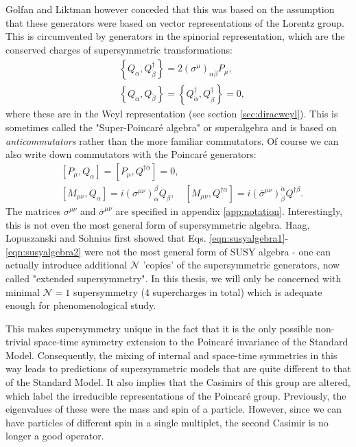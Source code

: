 Golfan and Liktman \cite{RN519} however conceded that this was based on the assumption that these generators were based on vector representations of the Lorentz group. This is circumvented by generators in the spinorial representation, which are the conserved charges of supersymmetric transformations:
\begin{align}
&\left\{ Q_{\alpha}, Q^{\dagger}_{\dot{\beta}} \right\}=2 \left( \sigma^{\mu}\right)_{\alpha \dot{\beta}}P_{\mu}, \label{eqn:susyalgebra1} \\
&\left\{ Q_{\alpha}, Q_{\dot{\beta}} \right\}=\left\{ Q^{\dagger}_{\dot{\alpha}}, Q^{\dagger}_{\dot{\beta}} \right\} = 0,
\label{eqn:susyalgebra2}
\end{align}
where these are in the Weyl representation (see section \ref{sec:diracweyl}). This is sometimes called the "Super-Poincar\'{e} algebra" or superalgebra and is based on \textit{anticommutators} rather than the more familiar commutators. Of course we can also write down commutators with the Poincar\'{e} generators:
\begin{align}
&\left[ P_{\mu},Q_{\alpha}\right]=\left[ P_{\mu},Q^{\dagger \dot{\alpha}}\right]=0, \label{eqn:comm1} \\
&\left[ M_{\mu\nu},Q_{\alpha}\right]=i \left(\sigma^{\mu\nu}\right)_{\alpha}^{\beta}Q_{\beta},\quad
\left[ M_{\mu\nu},Q^{\dagger \dot{\alpha}}\right]=i \left(\overline{\sigma}^{\mu\nu}\right)^{\dot{\alpha}}_{\dot{\beta}}Q^{\dagger \dot{\beta}}.
\end{align}
The matrices ${\sigma}^{\mu\nu}$ and $\overline{\sigma}^{\mu\nu}$ are specified in appendix \ref{app:notation}. Interestingly, this is not even the most general form of supersymmetric algebra. Haag, Lopuszanski and Sohnius \cite{RN522} first showed that Eqs. \ref{eqn:susyalgebra1}-\ref{eqn:susyalgebra2} were not the most general form of SUSY algebra - one can actually introduce additional $\mathcal{N}$ 'copies' of the supersymmetric generators, now called "extended supersymmetry". In this thesis, we will only be concerned with minimal $\mathcal{N}=1$ supersymmetry (4 supercharges in total) which is adequate enough for phenomenological study.

This makes supersymmetry unique in the fact that it is the only possible non-trivial space-time symmetry extension to the Poincar\'{e} invariance of the Standard Model. Consequently, the mixing of internal and space-time symmetries in this way leads to predictions of supersymmetric models that are quite different to that of the Standard Model. It also implies that the Casimirs of this group are altered, which label the irreducible representations of the Poincar\'{e} group. Previously, the eigenvalues of these were the mass and spin of a particle. However, since we can have particles of different spin in a single multiplet, the second Casimir is no longer a good operator.

